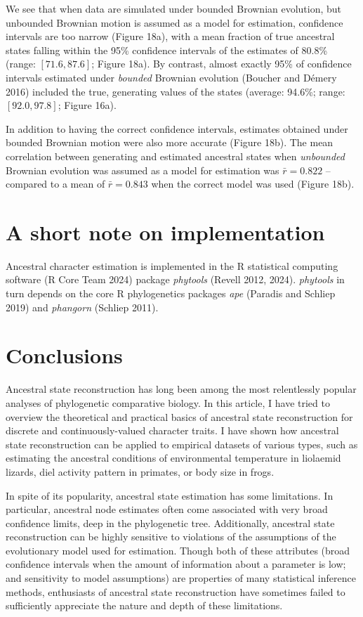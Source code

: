 \documentclass{article}
\begin{document}
We see that when data are simulated under bounded Brownian evolution, but unbounded Brownian motion is assumed as a model for estimation, confidence intervals are too narrow (Figure 18a), with a mean fraction of true ancestral states falling within the 95\% confidence intervals of the estimates of 80.8\% (range: \([71.6, 87.6]\); Figure 18a). By contrast, almost exactly 95\% of confidence intervals estimated under \emph{bounded} Brownian evolution (Boucher and Démery 2016) included the true, generating values of the states (average: 94.6\%; range: \([92.0, 97.8]\); Figure 16a).

In addition to having the correct confidence intervals, estimates obtained under bounded Brownian motion were also more accurate (Figure 18b). The mean correlation between generating and estimated ancestral states when \emph{unbounded} Brownian evolution was assumed as a model for estimation was \(\bar{r} = 0.822\) -- compared to a mean of \(\bar{r} = 0.843\) when the correct model was used (Figure 18b).

\section{A short note on implementation}\label{a-short-note-on-implementation}

Ancestral character estimation is implemented in the R statistical computing software (R Core Team 2024) package \emph{phytools} (Revell 2012, 2024). \emph{phytools} in turn depends on the core R phylogenetics packages \emph{ape} (Paradis and Schliep 2019) and \emph{phangorn} (Schliep 2011).

\section{Conclusions}\label{conclusions}

Ancestral state reconstruction has long been among the most relentlessly popular analyses of phylogenetic comparative biology. In this article, I have tried to overview the theoretical and practical basics of ancestral state reconstruction for discrete and continuously-valued character traits. I have shown how ancestral state reconstruction can be applied to empirical datasets of various types, such as estimating the ancestral conditions of environmental temperature in liolaemid lizards, diel activity pattern in primates, or body size in frogs.

In spite of its popularity, ancestral state estimation has some limitations. In particular, ancestral node estimates often come associated with very broad confidence limits, deep in the phylogenetic tree. Additionally, ancestral state reconstruction can be highly sensitive to violations of the assumptions of the evolutionary model used for estimation. Though both of these attributes (broad confidence intervals when the amount of information about a parameter is low; and sensitivity to model assumptions) are properties of many statistical inference methods, enthusiasts of ancestral state reconstruction have sometimes failed to sufficiently appreciate the nature and depth of these limitations.
\end{document}
